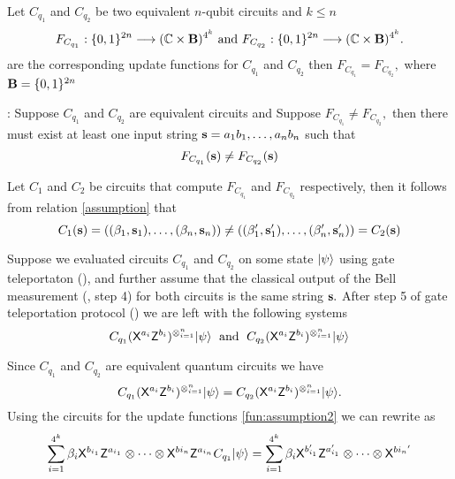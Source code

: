 \begin{lemma}
\label{lemma:nqubit}
Let $C_{q_1}$ and $C_{q_2}$ be two equivalent $n$-qubit circuits  and $k\leq n$
\begin{equation*}
 F_{C_{q_1}}:\{0,1\}^{2n}\longrightarrow  (\mathbb{C} \times {\bf B})^{4^k} \mbox{ and }
  F_{C_{q_2}}:\{0,1\}^{2n}\longrightarrow  (\mathbb{C} \times {\bf B})^{4^k}.
\end{equation*}
are the corresponding update functions for $C_{q_1}$ and $C_{q_2}$  then $F_{C_{q_1}}=F_{C_{q_2}},$ where ${\bf B}=\{0,1\}^{2n}$
\end{lemma}

: Suppose $C_{q_1}$ and $C_{q_2}$ are equivalent circuits and Suppose $F_{C_{q_1}}\neq F_{C_{q_2}},$  then there must exist at least one input string ${\bf s}=a_1b_1,\ldots, a_nb_n$ such that
\begin{equation}
\label{assumption}
F_{C_{q_1}}({\bf s})\neq F_{C_{q_2}}({\bf s})
\end{equation}

Let $C_1$ and $C_2$ be circuits that compute $F_{C_{q_1}}$ and $F_{C_{q_2}}$ respectively, then it follows from relation \ref{assumption} that
\begin{equation}
\label{fun:assumption2}
C_1({\bf s)}=((\beta_1, {\bf s}_1),\ldots, (\beta_n, {\bf s}_n))\neq ((\beta_1^\prime, {\bf s}_1^\prime),\ldots, (\beta_n^\prime, {\bf s}_n^\prime))=C_2({\bf s})
\end{equation}

Suppose we evaluated circuits $C_{q_1}$ and $C_{q_2}$ on some state ${\lvert}\psi\rangle$ using gate teleportaton (), and further assume that the classical output of the Bell measurement (, step 4) for both circuits is the same string ${\bf s}.$ After step 5 of gate teleportation protocol () we are left with the following systems
 \begin{equation*}
C_{q_1} ({\sf X}^{a_{i}}{\sf Z}^{b_{i}})^{\otimes_{i=1}^{n}}{\lvert}\psi\rangle \;\mbox{ and }\;
C_{q_2} ({\sf X}^{a_{i}}{\sf Z}^{b_{i}})^{\otimes_{i=1}^{n}}{\lvert}\psi\rangle
\end{equation*}

Since $C_{q_1}$ and $C_{q_2}$ are equivalent quantum circuits we have
 \begin{equation}
 \label{nqubit:eq10}
C_{q_1} ({\sf X}^{a_{i}}{\sf Z}^{b_{i}})^{\otimes_{i=1}^{n}}{\lvert}\psi\rangle=C_{q_2} ({\sf X}^{a_{i}}{\sf Z}^{b_{i}})^{\otimes_{i=1}^{n}}{\lvert}\psi\rangle.
\end{equation}
Using the circuits for the update functions \ref{fun:assumption2} we can rewrite  as
\begin{equation}
 \label{nqubit:eq11}
\sum_{i=1}^{4^k} \beta_i {\sf X}^{b_{i_1}} {\sf Z}^{a_{i_1}}\otimes \cdots \otimes {\sf X}^{b{i_n}} {\sf Z}^{a_{i_n}}C_{q_1}{\lvert}\psi\rangle=\sum_{i=1}^{4^k} \beta_i {\sf X}^{b_{i_1}^\prime} {\sf Z}^{a_{i_1}^\prime}\otimes \cdots \otimes {\sf X}^{b{i_n}^\prime}
\end{equation}

